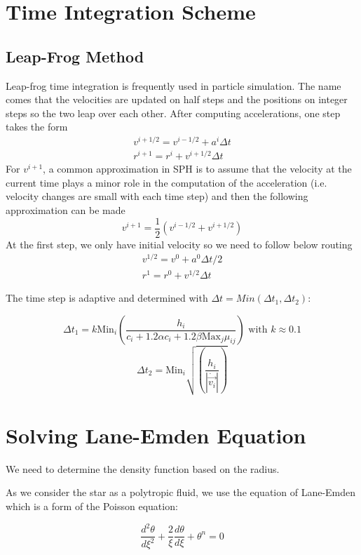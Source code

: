 \documentclass[notes.tex]{subfiles}
\begin{document}
\section{Time Integration Scheme}
\subsection{Leap-Frog Method}
Leap-frog time integration is frequently used in particle simulation. The name comes that the velocities are updated on half steps and the positions on integer steps so the two leap over each other. After computing accelerations, one step takes the form
\begin{align}
v^{i+1/2} = v^{i-1/2} + a^i \Delta t \\
r^{i+1} = r^i + v^{i+1/2} \Delta t
\end{align}
For $v^{i+1}$, a common approximation in SPH is to assume that the velocity at the current time plays a minor role in the computation of the acceleration (i.e. velocity changes are small with each time step) and then the following approximation can be made
\begin{equation}
v^{i+1} = \frac{1}{2} (v^{i-1/2}+v^{i+1/2})
\end{equation}
At the first step, we only have initial velocity so we need to follow below routing
\begin{align}
v^{1/2} = v^{0} + a^0 \Delta t/2 \\
r^{1} = r^0 + v^{1/2} \Delta t
\end{align}

The time step is adaptive and determined with $\Delta t = Min(\Delta t_1, \Delta t_2)$:

$$ \Delta t_1 = k \mbox{Min}_i(\frac{h_i}{c_i+1.2\alpha c_i + 1.2 \beta \mbox{Max}_j\mu_{ij}}) \mbox{ with } k \approx 0.1 $$
$$ \Delta t_2 = \mbox{Min}_i\sqrt{(\frac{h_i}{|\dot{\vec{v_i}}|})} $$

\section{Solving Lane-Emden Equation}

We need to determine the density function based on the radius.

As we consider the star as a polytropic fluid, we use the equation of Lane-Emden which is a form of the Poisson equation:

\begin{equation}\label{eq_LaneEmden}
  \frac{d^2\theta}{d \xi^2}+ \frac{2}{\xi}\frac{d\theta}{d\xi}+\theta^n = 0
\end{equation}
\end{document}
